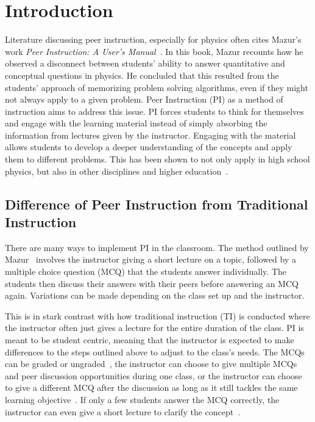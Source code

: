 \documentclass[twocolumn,secnumarabic,amssymb, nobibnotes, aps, prd]{revtex4-2}
\begin{document}
\maketitle
\tableofcontents

\section{Introduction}

    Literature discussing peer instruction, especially for physics often cites Mazur's work \textit{Peer Instruction: A User's Manual}~\cite{mazur1997peer,mazur1999}.
    In this book, Mazur recounts how he observed a disconnect between students' ability to answer quantitative and conceptual questions in physics.
    He concluded that this resulted from the students' approach of memorizing problem solving algorithms, even if they might not always apply to a given problem.
    Peer Instruction (PI) as a method of instruction aims to address this issue.
    PI forces students to think for themselves and engage with the learning material instead of simply absorbing the information from lectures given by the instructor.
    Engaging with the material allows students to develop a deeper understanding of the concepts and apply them to different problems.
    This has been shown to not only apply in high school physics, but also in other disciplines and higher education~\cite{johnson2008active,fagen2000factors,fagen2002peer}.

    \subsection{Difference of Peer Instruction from Traditional Instruction}

    There are many ways to implement PI in the classroom.
    The method outlined by Mazur~\cite{mazur1997peer} involves the instructor giving a short lecture on a topic, followed by a multiple choice question (MCQ) that the students answer individually.
    The students then discuss their answers with their peers before answering an MCQ again.
    Variations can be made depending on the class set up and the instructor.
    
    This is in stark contrast with how traditional instruction (TI) is conducted where the instructor often just gives a lecture for the entire duration of the class.
    PI is meant to be student centric, meaning that the instructor is expected to make differences to the steps outlined above to adjust to the class's needs.
    The MCQs can be graded or ungraded~\cite{crouch2001peer}, the instructor can choose to give multiple MCQs and peer discussion opportunities during one class, or the instructor can choose to give a different MCQ after the discussion as long as it still tackles the same learning objective~\cite{smith2009peer}.
    If only a few students answer the MCQ correctly, the instructor can even give a short lecture to clarify the concept~\cite{lasry2008peer}.
\end{document}
